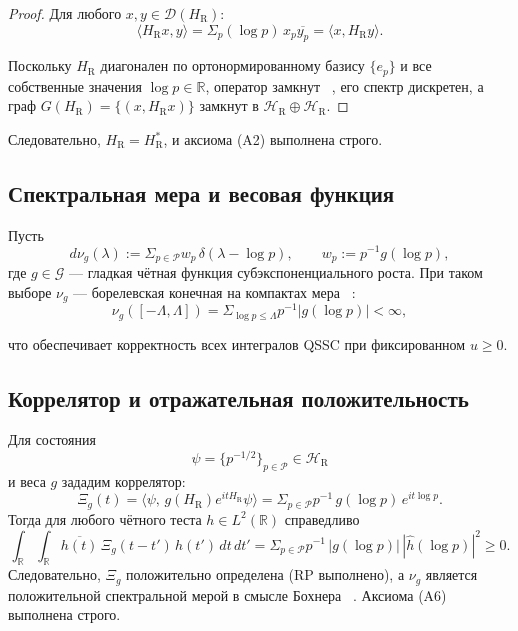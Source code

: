 \documentclass{article}
\numberwithin{equation}{section}
\theoremstyle{plain}
\theoremstyle{definition}
\theoremstyle{remark}
\def\delta{δ}\def\Delta{Δ}\def\epsilon{ε}\def\zeta{ζ}%
\def\infty{∞}\def\partial{∂}\def\sum{Σ}\def\int{∫}%
\begin{document}
\begin{proof}
Для любого \(x,y\in\mathcal D(H_{\mathrm R})\):
\begin{equation}
\langle H_{\mathrm R}x, y\rangle
=\sum_p (\log p)\,x_p\overline{y_p}
=\langle x, H_{\mathrm R}y\rangle.
\label{eq:QSSC0053}
\end{equation}

Поскольку \(H_{\mathrm R}\) диагонален по ортонормированному базису \(\{e_p\}\)
и все собственные значения \(\log p\in\mathbb R\), оператор замкнут ~\cite{ReedSimonI, Kato1995},
его спектр дискретен, а граф \(G(H_{\mathrm R})=\{(x,H_{\mathrm R}x)\}\)
замкнут в \(\mathcal H_{\mathrm R}\oplus\mathcal H_{\mathrm R}\).
\end{proof}

\noindent
Следовательно, \(H_{\mathrm R}=H_{\mathrm R}^\ast\), и аксиома (A2) выполнена строго.

\subsection*{Спектральная мера и весовая функция}

Пусть
\begin{equation}\label{eq:H1-measure}
d\nu_g(\lambda)
:=\sum_{p\in\mathcal P} w_p\,\delta(\lambda-\log p),\qquad
w_p:=p^{-1}g(\log p),
\end{equation}
где \(g\in\mathcal G\) — гладкая чётная функция субэкспоненциального роста.
При таком выборе \(\nu_g\) — борелевская конечная на компактах мера ~\cite{RudinFA}:
\begin{equation}
\nu_g([-\Lambda,\Lambda])
=\sum_{\log p\le\Lambda} p^{-1} |g(\log p)| < \infty,
\label{eq:QSSC0054}
\end{equation}

что обеспечивает корректность всех интегралов QSSC при фиксированном \(u\ge0\).

\subsection*{Коррелятор и отражательная положительность}

Для состояния
\begin{equation}\label{eq:H1-psi}
\psi=\{p^{-1/2}\}_{p\in\mathcal P}\in\mathcal H_{\mathrm R}
\end{equation}
и веса \(g\) зададим коррелятор:
\begin{equation}\label{eq:H1-Xi}
\Xi_g(t)=\langle\psi,\,g(H_{\mathrm R})e^{itH_{\mathrm R}}\psi\rangle
=\sum_{p\in\mathcal P} p^{-1}\,g(\log p)\,e^{it\log p}.
\end{equation}
Тогда для любого чётного теста \(h\in L^2(\mathbb R)\) справедливо
\begin{equation}\label{eq:H1-RP}
\int_{\mathbb R}\!\!\int_{\mathbb R} 
\overline{h(t)}\,\Xi_g(t-t')\,h(t')\,dt\,dt'
=\sum_{p\in\mathcal P} p^{-1}\,|g(\log p)|\,|\widehat h(\log p)|^2 \ge 0.
\end{equation}
Следовательно, \(\Xi_g\) положительно определена (RP выполнено),
а \(\nu_g\) является положительной спектральной мерой в смысле Бохнера ~\cite{Bochner1933, RudinHA}.  
Аксиома (A6) выполнена строго.
\end{document}
